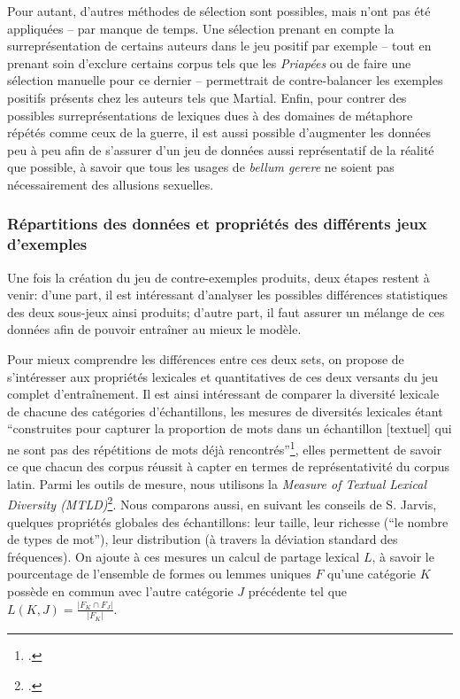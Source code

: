 Pour autant, d'autres méthodes de sélection sont possibles, mais n'ont pas été appliquées -- par manque de temps. Une sélection prenant en compte la surreprésentation de certains auteurs dans le jeu positif par exemple -- tout en prenant soin d'exclure certains corpus tels que les \textit{Priapées} ou de faire une sélection manuelle pour ce dernier -- permettrait de contre-balancer les exemples positifs présents chez les auteurs tels que Martial. Enfin, pour contrer des possibles surreprésentations de lexiques dues à des domaines de métaphore répétés comme ceux de la guerre, il est aussi possible d'augmenter les données peu à peu afin de s'assurer d'un jeu de données aussi représentatif de la réalité que possible, à savoir que tous les usages de \textit{bellum gerere} ne soient pas nécessairement des allusions sexuelles.

\subsubsection{Répartitions des données et propriétés des différents jeux d'exemples}

Une fois la création du jeu de contre-exemples produits, deux étapes restent à venir: d'une part, il est intéressant d'analyser les possibles différences statistiques des deux sous-jeux ainsi produits; d'autre part, il faut assurer un mélange de ces données afin de pouvoir entraîner au mieux le modèle.

Pour mieux comprendre les différences entre ces deux sets, on propose de s'intéresser aux propriétés lexicales et quantitatives de ces deux versants du jeu complet d'entraînement. Il est ainsi intéressant de comparer la diversité lexicale de chacune des catégories d'échantillons, les mesures de diversités lexicales étant \enquote{construites pour capturer la proportion de mots dans un échantillon [textuel] qui ne sont pas des répétitions de mots déjà rencontrés}\footcite[p. 44]{jarvis_capturing_2019}, elles permettent de savoir ce que chacun des corpus réussit à capter en termes de représentativité du corpus latin. Parmi les outils de mesure, nous utilisons la \textit{Measure of Textual Lexical Diversity (MTLD)}\footcite{mccarthy_assessment_2005}. Nous comparons aussi, en suivant les conseils de S. Jarvis, quelques propriétés globales des échantillons: leur taille, leur richesse (\enquote{le nombre de types de mot}), leur distribution (à travers la déviation standard des fréquences). On ajoute à ces mesures un calcul de partage lexical $L$, à savoir le pourcentage de l'ensemble de formes ou lemmes uniques $F$ qu'une catégorie $K$ possède en commun avec l'autre catégorie $J$ précédente tel que $L(K, J) = \frac{|F_{K} \cap F_{J}|}{|F_{K}|}$. 

